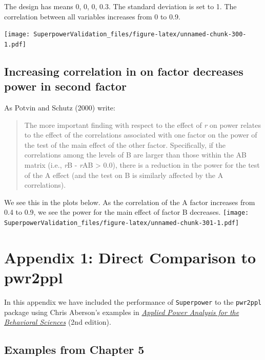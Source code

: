 \documentclass[]{book}
\begin{document}
The design has means 0, 0, 0, 0.3. The standard deviation is set to 1. The correlation between all variables increases from 0 to 0.9.

\texttt{[image: SuperpowerValidation\_files/figure-latex/unnamed-chunk-300-1.pdf]}

\hypertarget{increasing-correlation-in-on-factor-decreases-power-in-second-factor}{%
\section{Increasing correlation in on factor decreases power in second factor}\label{increasing-correlation-in-on-factor-decreases-power-in-second-factor}}

As Potvin and Schutz (2000) write:

\begin{quote}
The more important finding with respect to the effect of \emph{r} on power relates to the effect of the correlations associated with one factor on the power of the test of the main effect of the other factor. Specifically, if the correlations among the levels of B are larger than those within the AB matrix (i.e., \emph{r}B - \emph{r}AB \textgreater{} 0.0), there is a reduction in the power for the test of the A effect (and the test on B is similarly affected by the A correlations).
\end{quote}

We see this in the plots below. As the correlation of the A factor increases from 0.4 to 0.9, we see the power for the main effect of factor B decreases.
\texttt{[image: SuperpowerValidation\_files/figure-latex/unnamed-chunk-301-1.pdf]}

\hypertarget{appendix-1-direct-comparison-to-pwr2ppl}{%
\chapter*{Appendix 1: Direct Comparison to pwr2ppl}\label{appendix-1-direct-comparison-to-pwr2ppl}}

In this appendix we have included the performance of \texttt{Superpower} to the \texttt{pwr2ppl} package using Chris Aberson's examples in \href{https://www.crcpress.com/Applied-Power-Analysis-for-the-Behavioral-Sciences-2nd-Edition/Aberson/p/book/9781138044593}{\emph{Applied Power Analysis for the Behavioral Sciences}} (2nd edition).

\hypertarget{examples-from-chapter-5}{%
\section{Examples from Chapter 5}\label{examples-from-chapter-5}}
\end{document}

